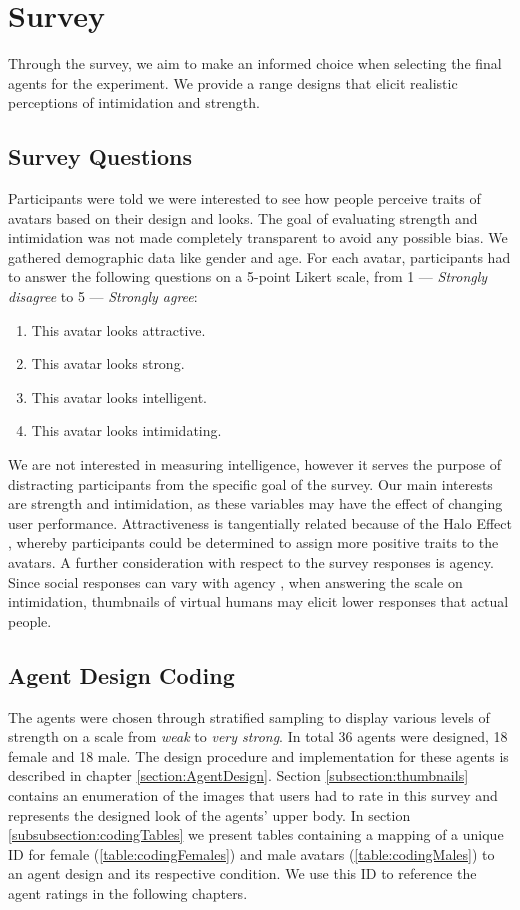 
\section{Survey}
\label{section:survey}
Through the survey, we aim to make an informed choice when selecting the final agents for the experiment. We provide a range designs that elicit realistic perceptions of intimidation and strength. 

\subsection{Survey Questions}
Participants were told we were interested to see how people perceive traits of avatars based on their design and looks. The goal of evaluating strength and intimidation was not made completely transparent to avoid any possible bias. We gathered demographic data like gender and age. For each avatar, participants had to answer the following questions on a 5-point Likert scale, from 1 --- \textit{Strongly disagree} to 5 --- \textit{Strongly agree}:
\begin{enumerate}
\itemsep0em 
\item This avatar looks attractive.
\item This avatar looks strong.
\item This avatar looks intelligent.
\item This avatar looks intimidating.
\end{enumerate}
We are not interested in measuring intelligence, however it serves the purpose of distracting participants from the specific goal of the survey. Our main interests are strength and intimidation, as these variables may have the effect of changing user performance. Attractiveness is tangentially related because of the Halo Effect \cite{nisbett1977halo}, whereby participants could be determined to assign more positive traits to the avatars. A further consideration with respect to the survey responses is agency. Since social responses can vary with agency \cite{fox2015avatars}, when answering the scale on intimidation, thumbnails of virtual humans may elicit lower responses that actual people.
 
\subsection{Agent Design Coding}
The agents were chosen through stratified sampling to display various levels of strength on a scale from \textit{weak} to \textit{very strong}. In total 36 agents were designed, 18 female and 18 male. The design procedure and implementation for these agents is described in chapter \ref{section:AgentDesign}. Section \ref{subsection:thumbnails} contains an enumeration of the images that users had to rate in this survey and represents the designed look of the agents' upper body. In section \ref{subsubsection:codingTables} we present tables containing a mapping of a unique ID for female (\ref{table:codingFemales}) and male avatars (\ref{table:codingMales}) to an agent design and its respective condition. We use this ID to reference the agent ratings in the following chapters.

